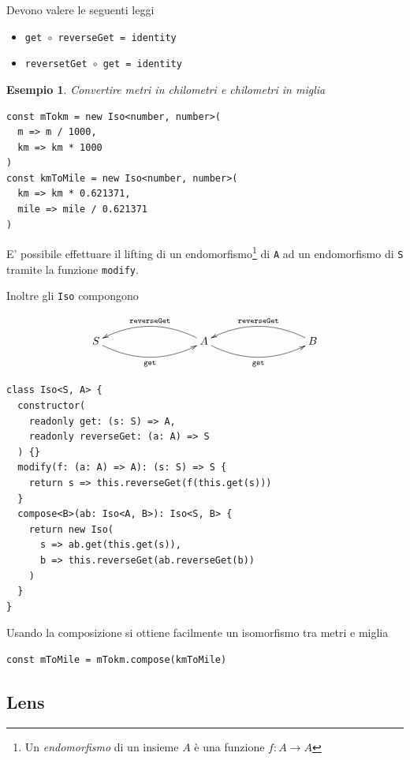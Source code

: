 \documentclass[12pt]{article}
\newtheorem{example}{Esempio}[section]
\begin{document}
Devono valere le seguenti leggi

\begin{itemize}
  \item \texttt{get $\circ$ reverseGet = identity}
  \item \texttt{reversetGet $\circ$ get = identity}
\end{itemize}

\begin{example}

Convertire metri in chilometri e chilometri in miglia

\begin{verbatim}
const mTokm = new Iso<number, number>(
  m => m / 1000,
  km => km * 1000
)
const kmToMile = new Iso<number, number>(
  km => km * 0.621371,
  mile => mile / 0.621371
)
\end{verbatim}
\end{example}

E' possibile effettuare il lifting di un endomorfismo\footnote{Un \emph{endomorfismo} di un insieme $A$ è una funzione $f: A \rightarrow A$}
di \texttt{A} ad un endomorfismo di \texttt{S} tramite la funzione \texttt{modify}.

Inoltre gli \texttt{Iso} compongono

\[
\xymatrixrowsep{3cm}
\xymatrixcolsep{3cm}
\xymatrix{
  S \ar@/_0.5cm/[r]_{\texttt{get}} & A \ar@/_0.5cm/[l]_{\texttt{reverseGet}} \ar@/_0.5cm/[r]_{\texttt{get}} & B \ar@/_0.5cm/[l]_{\texttt{reverseGet}}
}
\]

\begin{verbatim}
class Iso<S, A> {
  constructor(
    readonly get: (s: S) => A,
    readonly reverseGet: (a: A) => S
  ) {}
  modify(f: (a: A) => A): (s: S) => S {
    return s => this.reverseGet(f(this.get(s)))
  }
  compose<B>(ab: Iso<A, B>): Iso<S, B> {
    return new Iso(
      s => ab.get(this.get(s)),
      b => this.reverseGet(ab.reverseGet(b))
    )
  }
}
\end{verbatim}

Usando la composizione si ottiene facilmente un isomorfismo tra metri e miglia

\begin{verbatim}
const mToMile = mTokm.compose(kmToMile)
\end{verbatim}

\subsection{Lens}
\end{document}
